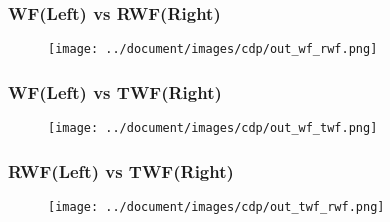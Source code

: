 \documentclass{beamer}
\theoremstyle{definition}
\theoremstyle{remark}
\begin{document}
\begin{frame}
\frametitle{WF(Left) vs RWF(Right)}
  \begin{figure}[!htbp]
    \centering
    \texttt{[image: ../document/images/cdp/out\_wf\_rwf.png]}
  \label{image:wf_vs_rwf}
  \end{figure}
\end{frame}

\begin{frame}
   \frametitle{WF(Left) vs TWF(Right)}
     \begin{figure}[!htbp]
       \centering
       \texttt{[image: ../document/images/cdp/out\_wf\_twf.png]}
     \label{images:wf_vs_twf_cdp}
     \end{figure}
   \end{frame}
\begin{frame}
\frametitle{RWF(Left) vs TWF(Right)}
  \begin{figure}[!htbp]
    \centering
    \texttt{[image: ../document/images/cdp/out\_twf\_rwf.png]}
  \label{image:twf_vs_rwf_cdp}
  \end{figure}
\end{frame}







\end{document}
